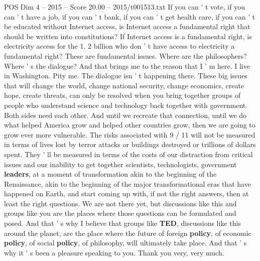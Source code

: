 \begin{textsample}{POS Dim 4 – 2015 – Score 20.00 – 2015/t001513.txt}
If you can ' t vote, if you can ' t have a job, if you can ' t bank, if you can ' t get health care, if you can ' t be educated without Internet access, is Internet access a fundamental right that should be written into constitutions?
If Internet access is a fundamental right, is electricity access for the 1. 2 billion who don ' t have access to electricity a fundamental right?
These are fundamental issues.
Where are the philosophers?
Where ' s the dialogue?
And that brings me to the reason that I ' m here.
I live in Washington.
Pity me.
The dialogue isn ' t happening there.
These big issues that will change the world, change national security, change economics, create hope, create threats, can only be resolved when you bring together groups of people who understand science and technology back together with government.
Both sides need each other.
And until we recreate that connection, until we do what helped America grow and helped other countries grow, then we are going to grow ever more vulnerable.
The risks associated with 9 / 11 will not be measured in terms of lives lost by terror attacks or buildings destroyed or trillions of dollars spent.
They ' ll be measured in terms of the costs of our distraction from critical issues and our inability to get together scientists, technologists, government \textbf{leaders}, at a moment of transformation akin to the beginning of the Renaissance, akin to the beginning of the major transformational eras that have happened on Earth, and start coming up with, if not the right answers, then at least the right questions.
We are not there yet, but discussions like this and groups like you are the places where those questions can be formulated and posed.
And that ' s why I believe that groups like \textbf{TED}, discussions like this around the planet, are the place where the future of foreign \textbf{policy}, of economic \textbf{policy}, of social \textbf{policy}, of philosophy, will ultimately take place.
And that ' s why it ' s been a pleasure speaking to you.
Thank you very, very much.

\end{textsample}
